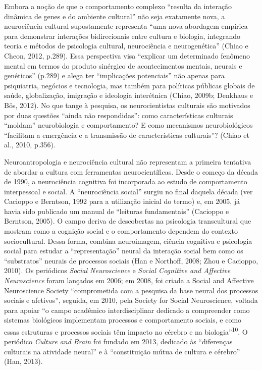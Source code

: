 Embora a noção de que o comportamento complexo ``resulta da interação
dinâmica de genes e do ambiente cultural'' não seja exatamente nova, a
neurociência cultural supostamente representa ``uma nova abordagem
empírica para demonstrar interações bidirecionais entre cultura e
biologia, integrando teoria e métodos de psicologia cultural,
neurociência e neurogenética'' (Chiao e Cheon, 2012, p.289). Essa
perspectiva visa ``explicar um determinado fenômeno mental em termos do
produto sinérgico de acontecimentos mentais, neurais e genéticos''
(p.289) e alega ter ``implicações potenciais'' não apenas para
psiquiatria, negócios e tecnologia, mas também para políticas públicas
globais de saúde, globalização, imigração e ideologia interétnica
(Chiao, 2009b; Denkhaus e Bös, 2012). No que tange à pesquisa, os
neurocientistas culturais são motivados por duas questões ``ainda não
respondidas'': como características culturais ``moldam'' neurobiologia e
comportamento? E como mecanismos neurobiológicos ``facilitam a
emergência e a transmissão de características culturais''? (Chiao et
al., 2010, p.356).

Neuroantropologia e neurociência cultural não representam a primeira
tentativa de abordar a cultura com ferramentas neurocientíficas. Desde o
começo da década de 1990, a neurociência cognitiva foi incorporada ao
estudo de comportamento interpessoal e social. A ``neurociência social''
surgiu no final daquela década (ver Cacioppo e Berntson, 1992 para a
utilização inicial do termo) e, em 2005, já havia sido publicado um
manual de ``leituras fundamentais'' (Cacioppo e Berntson, 2005). O campo
deriva de descobertas na psicologia transcultural que mostram como a
cognição social e o comportamento dependem do contexto sociocultural.
Dessa forma, combina neuroimagem, ciência cognitiva e psicologia social
para estudar a ``representação'' neural da interação social bem como os
``substratos'' neurais de processos sociais (Han e Northoff, 2008; Zhou
e Cacioppo, 2010). Os periódicos \emph{Social Neuroscience} e
\emph{Social Cognitive and Affective Neuroscience} foram lançados em
2006; em 2008, foi criada a Social and Affective Neuroscience Society
``comprometida com a pesquisa da base neural dos processos sociais e
afetivos'', seguida, em 2010, pela Society for Social Neuroscience,
voltada para apoiar ``o campo acadêmico interdisciplinar dedicado a
compreender como sistemas biológicos implementam processos e
comportamento sociais, e como essas estruturas e processos sociais têm
impacto no cérebro e na biologia''\textsuperscript{10}. O periódico
\emph{Culture and Brain} foi fundado em 2013, dedicado às ``diferenças
culturais na atividade neural'' e à ``constituição mútua de cultura e
cérebro'' (Han, 2013).

